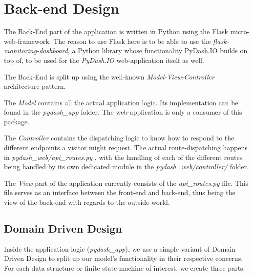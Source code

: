 \hypertarget{back-end-design}{%
\section{Back-end Design}\label{back-end-design}}

The Back-End part of the application is written in Python using the
Flask micro-web-framework. The reason to use Flask here is to be able to
use the \emph{flask-monitoring-dashboard}, a Python library whose
functionality PyDash.IO builds on top of, to be used for the
\emph{PyDash.IO} web-application itself as well.

The Back-End is split up using the well-known
\emph{Model-View-Controller} architecture pattern.

The \emph{Model} contains all the actual application logic. Its
implementation can be found in the \emph{pydash\_app} folder. The
web-application is only a consumer of this package.

The \emph{Controller} contains the dispatching logic to know how to
respond to the different endpoints a visitor might request. The actual
route-dispatching happens in \emph{pydash\_web/api\_routes.py} , with
the handling of each of the different routes being handled by its own
dedicated module in the \emph{pydash\_web/controller/} folder.

The \emph{View} part of the application currently consists of the
\emph{api\_routes.py} file. This file serves as an interface between the
front-end and back-end, thus being the view of the back-end with regards
to the outside world.

\hypertarget{domain-driven-design}{%
\subsection{Domain Driven Design}\label{domain-driven-design}}

Inside the application logic (\emph{pydash\_app}), we use a simple
variant of Domain Driven Design to split up our model's functionality in
their respective concerns. For each data structure or
finite-state-machine of interest, we create three parts:

